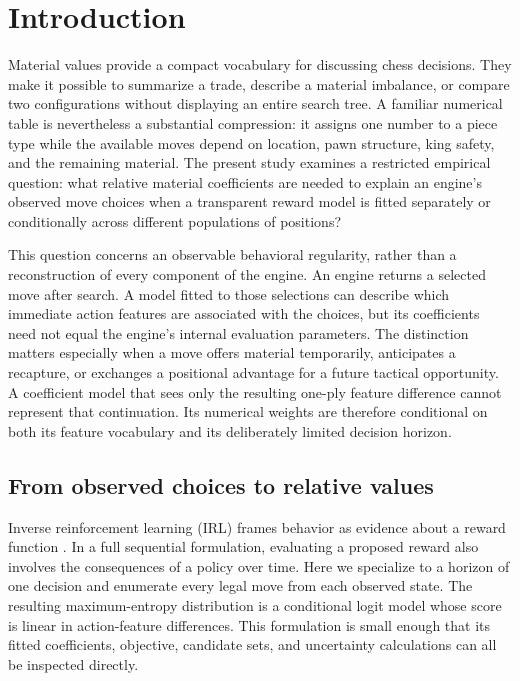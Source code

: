 \documentclass{jcst}
\begin{document}
\section{Introduction}
Material values provide a compact vocabulary for discussing chess decisions. They make it possible to summarize a trade, describe a material imbalance, or compare two configurations without displaying an entire search tree. A familiar numerical table is nevertheless a substantial compression: it assigns one number to a piece type while the available moves depend on location, pawn structure, king safety, and the remaining material. The present study examines a restricted empirical question: what relative material coefficients are needed to explain an engine's observed move choices when a transparent reward model is fitted separately or conditionally across different populations of positions?

This question concerns an observable behavioral regularity, rather than a reconstruction of every component of the engine. An engine returns a selected move after search. A model fitted to those selections can describe which immediate action features are associated with the choices, but its coefficients need not equal the engine's internal evaluation parameters. The distinction matters especially when a move offers material temporarily, anticipates a recapture, or exchanges a positional advantage for a future tactical opportunity. A coefficient model that sees only the resulting one-ply feature difference cannot represent that continuation. Its numerical weights are therefore conditional on both its feature vocabulary and its deliberately limited decision horizon.

\subsection{From observed choices to relative values}
Inverse reinforcement learning (IRL) frames behavior as evidence about a reward function \cite{ng2000,ziebart}. In a full sequential formulation, evaluating a proposed reward also involves the consequences of a policy over time. Here we specialize to a horizon of one decision and enumerate every legal move from each observed state. The resulting maximum-entropy distribution is a conditional logit model whose score is linear in action-feature differences. This formulation is small enough that its fitted coefficients, objective, candidate sets, and uncertainty calculations can all be inspected directly.
\end{document}
